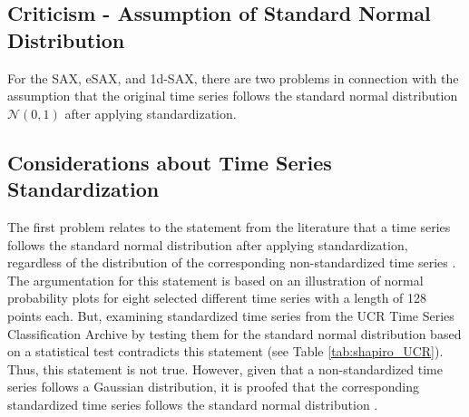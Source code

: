 \subsection{Criticism - Assumption of Standard Normal Distribution}
For the \ac{SAX}, \ac{eSAX}, and \ac{1d-SAX}, there are two problems in connection with the assumption that the original time series follows the standard normal distribution $\mathcal{N}(0,1)$ after applying standardization.
\subsection*{Considerations about Time Series Standardization}
The first problem relates to the statement from the literature that a time series follows the standard normal distribution after applying standardization, regardless of the distribution of the corresponding non-standardized time series \cite{SAX_Lin}. The argumentation for this statement is based on an illustration of normal probability plots for eight selected different time series with a length of 128 points each. But, examining standardized time series from the UCR Time Series Classification Archive \cite{UCR_Archive} by testing them for the standard normal distribution based on a statistical test contradicts this statement (see Table \ref{tab:shapiro_UCR}). Thus, this statement is not true. However, given that a non-standardized time series follows a Gaussian distribution, it is proofed that the corresponding standardized time series follows the standard normal distribution \cite{Standardization}.
